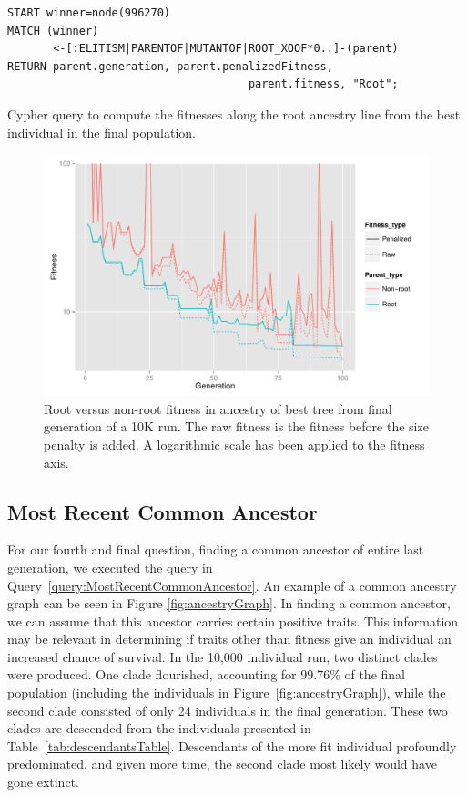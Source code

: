 \documentclass[12pt]{article}
\begin{document}
\begin{Query}
\begin{verbatim}
START winner=node(996270)
MATCH (winner)
       <-[:ELITISM|PARENTOF|MUTANTOF|ROOT_XOOF*0..]-(parent)
RETURN parent.generation, parent.penalizedFitness, 
                                     parent.fitness, "Root";
\end{verbatim}
\caption{Cypher query to compute the fitnesses along the root ancestry line from the best individual in the final population.}
\label{query:WinningRootLineFitness}
\end{Query}

\begin{figure}[tb]
 \centering
 \includegraphics[height=0.68\textwidth]{Combined_fitness_over_time}
 \caption{Root versus non-root fitness in ancestry of best tree from final generation of a 10K run. The raw fitness is the fitness before the size penalty is added. A logarithmic scale has been applied to the fitness axis.}
 \label{fig:rootVsNonrootFitness}
\end{figure}

\subsection{Most Recent Common Ancestor}
\label{sec:MostRecentCommonAncestor}

For our fourth and final question, finding a common ancestor of entire last generation, we executed the query in Query~\ref{query:MostRecentCommonAncestor}. An example of a common ancestry graph can be seen in Figure \ref{fig:ancestryGraph}. In finding a common ancestor, we can assume that this ancestor carries certain positive traits. This information may be relevant in determining if traits other than fitness give an individual an increased chance of survival. In the 10,000 individual run, two distinct clades were produced. One clade flourished, accounting for 99.76\% of the final population (including the individuals in Figure~\ref{fig:ancestryGraph}), while the second clade consisted of only 24 individuals in the final generation. These two clades are descended from the individuals presented in Table~\ref{tab:descendantsTable}. Descendants of the more fit individual profoundly predominated, and given more time, the second clade most likely would have gone extinct. 
\end{document}
